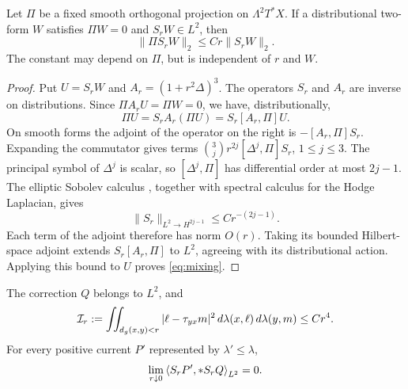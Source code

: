 \begin{lemma}\label{lem:mixing}
Let \(\Pi\) be a fixed smooth orthogonal projection on
\(\Lambda^2T^*X\). If a distributional two-form \(W\)
satisfies \(\Pi W=0\) and \(S_rW\in L^2\), then
\begin{equation}\label{eq:mixing}
\|\Pi S_rW\|_2\le Cr\|S_rW\|_2.
\end{equation}
The constant may depend on \(\Pi\), but is independent of
\(r\) and \(W\).
\end{lemma}

\begin{proof}
Put \(U=S_rW\) and \(A_r=(1+r^2\Delta)^3\). The operators
\(S_r\) and \(A_r\) are inverse on distributions. Since
\(\Pi A_rU=\Pi W=0\), we have, distributionally,
\[
\Pi U=S_rA_r(\Pi U)=S_r[A_r,\Pi]U.
\]
On smooth forms the adjoint of the operator on the right
is \(-[A_r,\Pi]S_r\). Expanding the commutator gives terms
\(\binom3j r^{2j}[\Delta^j,\Pi]S_r\), \(1\le j\le3\).
The principal symbol of \(\Delta^j\) is scalar, so
\([\Delta^j,\Pi]\) has differential order at most \(2j-1\).
The elliptic Sobolev calculus
\cite[Propositions~6.7--6.8]{MelroseIML}, together with
spectral calculus for the Hodge Laplacian, gives
\[
\|S_r\|_{L^2\to H^{2j-1}}\le Cr^{-(2j-1)}.
\]
Each term of the adjoint therefore has norm \(O(r)\).
Taking its bounded Hilbert-space adjoint extends
\(S_r[A_r,\Pi]\) to \(L^2\), agreeing with its distributional
action. Applying this bound to \(U\) proves
\eqref{eq:mixing}.
\end{proof}

\begin{proposition}\label{prop:energy}
The correction \(Q\) belongs to \(L^2\), and
\begin{equation}\label{eq:angular}
\mathcal I_r:=
\iint_{d_g(x,y)<r}|\ell-\tau_{yx}m|^2
\,d\lambda(x,\ell)\,d\lambda(y,m)\le Cr^4.
\end{equation}
For every positive current \(P'\) represented by
\(\lambda'\le\lambda\),
\begin{equation}\label{eq:cross-vanish}
\lim_{r\downarrow0}\left\langle S_rP',*S_rQ\right\rangle_{L^2}=0.
\end{equation}
\end{proposition}

